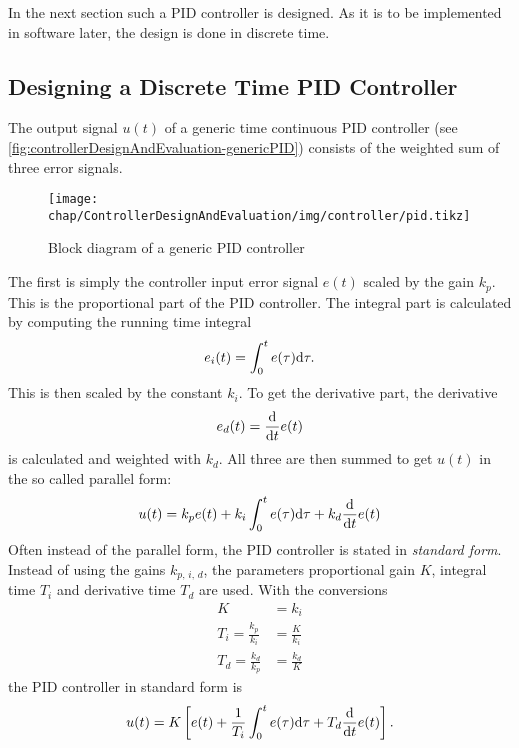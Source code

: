 In the next section such a PID controller is designed. As it is to be implemented in software later, the design is done in discrete time.

\subsection{Designing a Discrete Time PID Controller}\label{sec:controlDesign}
The output signal $u(t)$ of a generic time continuous PID controller (see \autoref{fig:controllerDesignAndEvaluation-genericPID}) consists of the weighted sum of three error signals.

\begin{figure}[tb]
	\centering
	\texttt{[image: chap/ControllerDesignAndEvaluation/img/controller/pid.tikz]}
	\caption{Block diagram of a generic PID controller}
	\label{fig:controllerDesignAndEvaluation-genericPID}
\end{figure}
The first is simply the controller input error signal $e(t)$ scaled by the gain $k_p$. This is the proportional part of the PID controller. The integral part is calculated by computing the running time integral
\begin{equation}\label{eq:ei}
e_i(t)=\int_{0}^{t} e(\tau) \text{d}{\tau}.
\end{equation}
This is then scaled by the constant $k_i$. To get the derivative part, the derivative
\begin{equation}\label{eq:ed}
e_d(t)=\frac{\text{d}{}}{\text{d}{t}} e(t)
\end{equation}
is calculated and weighted with $k_d$.
All three are then summed to get $u(t)$ in the so called parallel form\cite[p.~5]{Dodds2015}:
\begin{equation}
u(t)=k_p e(t) + k_i \int_{0}^{t} e(\tau) \text{d}{\tau} + k_d \frac{\text{d}{}}{\text{d}{t}} e(t)
\end{equation}
Often instead of the parallel form, the PID controller is stated in \textit{standard form}. Instead of using the gains $k_{p,\,i,\,d}$, the parameters proportional gain $K$, integral time $T_i$ and derivative time $T_d$ are used.\cite[p.~76]{Aastroem1995} With the conversions
\begin{align}
K&=k_i\\
T_i=\frac{k_p}{k_i}&=\frac{K}{k_i}\\
T_d=\frac{k_d}{k_p}&=\frac{k_d}{K}
\end{align}
the PID controller in standard form is
\begin{equation}
u(t)=K\left[e(t) + \frac{1}{T_i} \int_{0}^{t} e(\tau) \text{d}{\tau} + T_d \frac{\text{d}{}}{\text{d}{t}} e(t)\right].
\end{equation}
